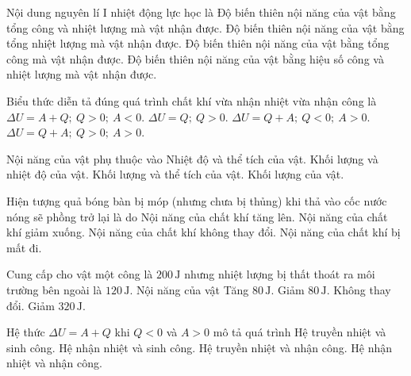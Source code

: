 \begin{ex}
Nội dung nguyên lí I nhiệt động lực học là
\choice
{\True Độ biến thiên nội năng của vật bằng tổng công và nhiệt lượng mà vật nhận được.}
{Độ biến thiên nội năng của vật bằng tổng nhiệt lượng mà vật nhận được.}
{Độ biến thiên nội năng của vật bằng tổng công mà vật nhận được.}
{Độ biến thiên nội năng của vật bằng hiệu số công và nhiệt lượng mà vật nhận được.}
\end{ex}
\begin{ex}
Biểu thức diễn tả đúng quá trình chất khí vừa nhận nhiệt vừa nhận công là
\choice
{$\Delta U=A+Q;\ Q>0;\ A<0$.}
{$\Delta U=Q;\ Q>0$.}
{$\Delta U=Q+A;\ Q<0;\ A>0$.}
{\True $\Delta U=Q+A;\ Q>0;\ A>0$.}
\end{ex}
\begin{ex}
Nội năng của vật phụ thuộc vào
\choice
{\True Nhiệt độ và thể tích của vật.}
{Khối lượng và nhiệt độ của vật.}
{Khối lượng và thể tích của vật.}
{Khối lượng của vật.}
\end{ex}
\begin{ex}
Hiện tượng quả bóng bàn bị móp (nhưng chưa bị thủng) khi thả vào cốc nước nóng sẽ phồng trở lại là do
\choice
{\True Nội năng của chất khí tăng lên.}
{Nội năng của chất khí giảm xuống.}
{Nội năng của chất khí không thay đổi.}
{Nội năng của chất khí bị mất đi.}
\end{ex}
\begin{ex}
Cung cấp cho vật một công là $200\,\mathrm{J}$ nhưng nhiệt lượng bị thất thoát ra môi trường bên ngoài là $120\,\mathrm{J}$. Nội năng của vật
\choice
{\True Tăng $80\,\mathrm{J}$.}
{Giảm $80\,\mathrm{J}$.}
{Không thay đổi.}
{Giảm $320\,\mathrm{J}$.}
\end{ex}
\begin{ex}
Hệ thức $\Delta U=A+Q$ khi $Q<0$ và $A>0$ mô tả quá trình
\choice
{Hệ truyền nhiệt và sinh công.}
{Hệ nhận nhiệt và sinh công.}
{\True Hệ truyền nhiệt và nhận công.}
{Hệ nhận nhiệt và nhận công.}
\end{ex}

